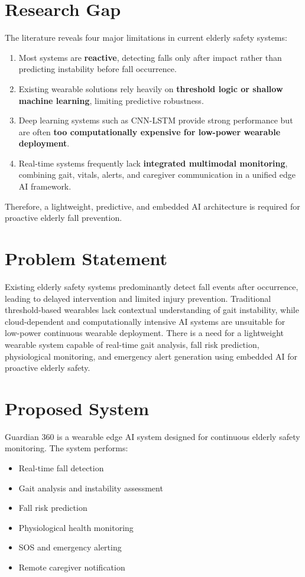\documentclass[conference]{IEEEtran}
\begin{document}
\section{Research Gap}
The literature reveals four major limitations in current elderly safety systems:

\begin{enumerate}[leftmargin=*,noitemsep]
\item Most systems are \textbf{reactive}, detecting falls only after impact rather than predicting instability before fall occurrence.
\item Existing wearable solutions rely heavily on \textbf{threshold logic or shallow machine learning}, limiting predictive robustness.
\item Deep learning systems such as CNN-LSTM provide strong performance but are often \textbf{too computationally expensive for low-power wearable deployment}.
\item Real-time systems frequently lack \textbf{integrated multimodal monitoring}, combining gait, vitals, alerts, and caregiver communication in a unified edge AI framework.
\end{enumerate}

Therefore, a lightweight, predictive, and embedded AI architecture is required for proactive elderly fall prevention.

\section{Problem Statement}
Existing elderly safety systems predominantly detect fall events after occurrence, leading to delayed intervention and limited injury prevention. Traditional threshold-based wearables lack contextual understanding of gait instability, while cloud-dependent and computationally intensive AI systems are unsuitable for low-power continuous wearable deployment. There is a need for a lightweight wearable system capable of real-time gait analysis, fall risk prediction, physiological monitoring, and emergency alert generation using embedded AI for proactive elderly safety.

\section{Proposed System}
Guardian 360 is a wearable edge AI system designed for continuous elderly safety monitoring. The system performs:
\begin{itemize}[leftmargin=*]
\item Real-time fall detection
\item Gait analysis and instability assessment
\item Fall risk prediction
\item Physiological health monitoring
\item SOS and emergency alerting
\item Remote caregiver notification
\end{itemize}
\end{document}
